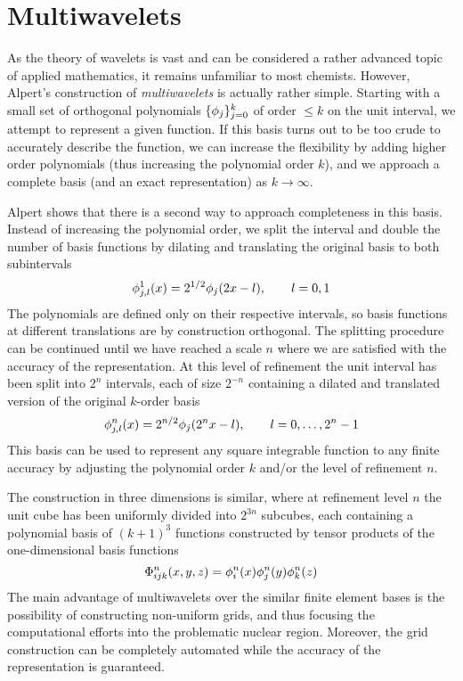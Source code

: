 \section{Multiwavelets}
As the theory of wavelets is vast and can be considered a rather advanced topic
of applied mathematics, it remains unfamiliar to most chemists. However, 
Alpert's\cite{Alpert} construction of \emph{multiwavelets} is actually
rather simple. Starting with a small set of orthogonal polynomials 
$\lbrace\phi_j\rbrace_{j=0}^k$ of order $\leq k$ on the unit interval, we 
attempt to represent a given function. If this basis turns out to be too crude 
to accurately describe the function, we can increase the flexibility by adding
higher order polynomials (thus increasing the polynomial order $k$), and we
approach a complete basis (and an exact representation) as $k\rightarrow\infty$.

Alpert shows that there is a second way to approach completeness in this basis.
Instead of increasing the polynomial order, we split the interval and double 
the number of basis functions by dilating and translating the original basis 
to both subintervals
\begin{equation}
    \phi_{j,l}^1(x) = 2^{1/2}\phi_j(2x - l), \qquad l = 0,1
\end{equation}
The polynomials are defined only on their respective intervals, so basis functions 
at different translations are by construction orthogonal. The splitting procedure 
can be continued until we have reached a scale $n$ where we are satisfied with the 
accuracy of the representation. At this level of refinement the unit interval has 
been split into $2^n$ intervals, each of size $2^{-n}$ containing a dilated and 
translated version of the original $k$-order basis
\begin{equation}
    \phi_{j,l}^n(x) = 2^{n/2}\phi_j(2^nx - l), \qquad l = 0,\dots,2^n-1
\end{equation}
This basis can be used to represent any square integrable function to any finite 
accuracy by adjusting the polynomial order $k$ and/or the level of refinement $n$. 

The construction in three dimensions is similar, where at refinement level $n$
the unit cube has been uniformly divided into $2^{3n}$ subcubes, each containing
a polynomial basis of $(k+1)^3$ functions constructed by tensor products of the
one-dimensional basis functions
\begin{equation}
    \Phi^n_{ijk}(x,y,z) = \phi^n_i(x)\phi^n_j(y)\phi^n_k(z)
\end{equation}
The main advantage of multiwavelets over the similar finite element bases is the
possibility of constructing non-uniform grids, and thus focusing the computational
efforts into the problematic nuclear region. Moreover, the grid construction can 
be completely automated while the accuracy of the representation is guaranteed.

